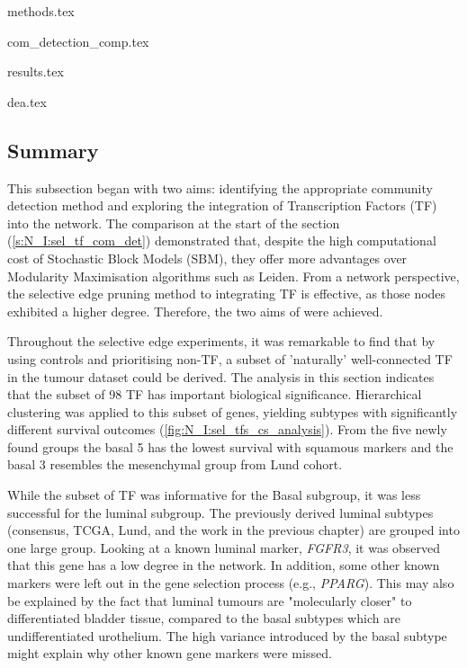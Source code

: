 {methods.tex}

{com_detection_comp.tex}

{results.tex}

{dea.tex}


\subsection{Summary}

This subsection began with two aims: identifying the appropriate community detection method and exploring the integration of Transcription Factors (TF) into the network. The comparison at the start of the section (\ref{s:N_I:sel_tf_com_det}) demonstrated that, despite the high computational cost of Stochastic Block Models (SBM), they offer more advantages over Modularity Maximisation algorithms such as Leiden. From a network perspective, the selective edge pruning method to integrating TF is effective, as those nodes exhibited a higher degree. Therefore, the two aims of were achieved.

Throughout the selective edge experiments, it was remarkable to find that by using controls and prioritising non-TF, a subset of 'naturally' well-connected TF in the tumour dataset could be derived. The analysis in this section indicates that the subset of 98 TF has important biological significance. Hierarchical clustering was applied to this subset of genes, yielding subtypes with significantly different survival outcomes (\cref{fig:N_I:sel_tfs_cs_analysis}).  From the five newly found groups the basal 5 has the lowest survival with squamous markers and the basal 3 resembles the mesenchymal group from Lund cohort.

While the subset of TF was informative for the Basal subgroup, it was less successful for the luminal subgroup. The previously derived luminal subtypes (consensus, TCGA, Lund, and the work in the previous chapter) are grouped into one large group. Looking at a known luminal marker, \textit{FGFR3}, it was observed that this gene has a low degree in the network. In addition, some other known markers were left out in the gene selection process (e.g., \textit{PPARG}). This may also be explained by the fact that luminal tumours are "molecularly closer" to differentiated bladder tissue, compared to the basal subtypes which are undifferentiated urothelium. The high variance introduced by the basal subtype might explain why other known gene markers were missed.

